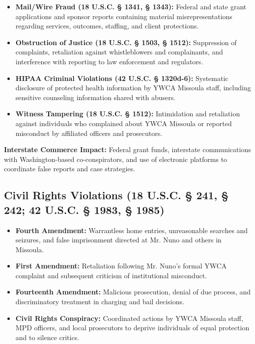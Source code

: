 \documentclass[12pt,oneside]{article}
\begin{document}
\begin{flushleft}
\begin{itemize}
\item \textbf{Mail/Wire Fraud (18 U.S.C. § 1341, § 1343):} Federal and state grant applications and sponsor reports containing material misrepresentations regarding services, outcomes, staffing, and client protections.
\item \textbf{Obstruction of Justice (18 U.S.C. § 1503, § 1512):} Suppression of complaints, retaliation against whistleblowers and complainants, and interference with reporting to law enforcement and regulators.
\item \textbf{HIPAA Criminal Violations (42 U.S.C. § 1320d-6):} Systematic disclosure of protected health information by YWCA Missoula staff, including sensitive counseling information shared with abusers.
\item \textbf{Witness Tampering (18 U.S.C. § 1512):} Intimidation and retaliation against individuals who complained about YWCA Missoula or reported misconduct by affiliated officers and prosecutors.
\end{itemize}

\textbf{Interstate Commerce Impact:} Federal grant funds, interstate communications with Washington-based co-conspirators, and use of electronic platforms to coordinate false reports and case strategies.

\subsection*{Civil Rights Violations (18 U.S.C. § 241, § 242; 42 U.S.C. § 1983, § 1985)}

\begin{itemize}
\item \textbf{Fourth Amendment:} Warrantless home entries, unreasonable searches and seizures, and false imprisonment directed at Mr. Nuno and others in Missoula.
\item \textbf{First Amendment:} Retaliation following Mr. Nuno's formal YWCA complaint and subsequent criticism of institutional misconduct.
\item \textbf{Fourteenth Amendment:} Malicious prosecution, denial of due process, and discriminatory treatment in charging and bail decisions.
\item \textbf{Civil Rights Conspiracy:} Coordinated actions by YWCA Missoula staff, MPD officers, and local prosecutors to deprive individuals of equal protection and to silence critics.
\end{itemize}


\end{flushleft}
\end{document}
